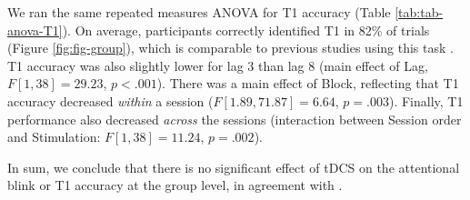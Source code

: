 \documentclass[11pt,]{memoir}
\begin{document}
We ran the same repeated measures ANOVA for T1 accuracy (Table \ref{tab:tab-anova-T1}). On average, participants correctly identified T1 in 82\% of trials (Figure \ref{fig:fig-group}), which is comparable to previous studies using this task \autocites[86\% in][]{London2015}[in 82\% in][]{Slagter2013}. T1 accuracy was also slightly lower for lag 3 than lag 8 (main effect of Lag, \(F[1, 38] = 29.23\), \(p < .001\)). There was a main effect of Block, reflecting that T1 accuracy decreased \emph{within} a session (\(F[1.89, 71.87] = 6.64\), \(p = .003\)). Finally, T1 performance also decreased \emph{across} the sessions (interaction between Session order and Stimulation: \(F[1, 38] = 11.24\), \(p = .002\)).

In sum, we conclude that there is no significant effect of tDCS on the attentional blink or T1 accuracy at the group level, in agreement with \textcite{London2015}.

\begingroup
\setlength{\LTleft}{-20cm plus -1fill}
\setlength{\LTright}{\LTleft}
\end{document}
